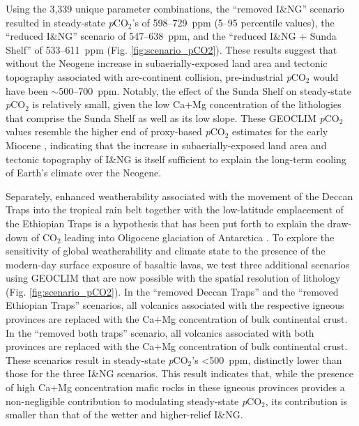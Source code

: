\documentclass[11pt,letterpaper]{article}
\newcommand{\pCOtwo}{\textit{p}CO$_{2}$\xspace}
\newcommand{\COtwo}{CO$_{2}$\xspace}
\begin{document}
Using the 3,339 unique parameter combinations, the ``removed I\&NG'' scenario resulted in steady-state \pCOtwo's of 598--729~ppm (5--95 percentile values), the ``reduced I\&NG'' scenario of 547--638~ppm, and the ``reduced I\&NG + Sunda Shelf'' of 533--611~ppm (Fig. \ref{fig:scenario_pCO2}). These results suggest that without the Neogene increase in subaerially-exposed land area and tectonic topography associated with arc-continent collision, pre-industrial \pCOtwo would have been $\sim$500--700~ppm. Notably, the effect of the Sunda Shelf on steady-state \pCOtwo is relatively small, given the low Ca+Mg concentration of the lithologies that comprise the Sunda Shelf as well as its low slope. These GEOCLIM \pCOtwo values resemble the higher end of proxy-based \pCOtwo estimates for the early Miocene \citep{Foster2017a}, indicating that the increase in subaerially-exposed land area and tectonic topography of I\&NG is itself sufficient to explain the long-term cooling of Earth's climate over the Neogene.

Separately, enhanced weatherability associated with the movement of the Deccan Traps into the tropical rain belt together with the low-latitude emplacement of the Ethiopian Traps is a hypothesis that has been put forth to explain the draw-down of \COtwo leading into Oligocene glaciation of Antarctica \citep{Kent2008a, Kent2013a}. To explore the sensitivity of global weatherability and climate state to the presence of the modern-day surface exposure of basaltic lavas, we test three additional scenarios using GEOCLIM that are now possible with the spatial resolution of lithology (Fig. \ref{fig:scenario_pCO2}). In the ``removed Deccan Traps'' and the ``removed Ethiopian Traps'' scenarios, all volcanics associated with the respective igneous provinces are replaced with the Ca+Mg concentration of bulk continental crust. In the ``removed both traps'' scenario, all volcanics associated with both provinces are replaced with the Ca+Mg concentration of bulk continental crust. These scenarios result in steady-state \pCOtwo's \textless500~ppm, distinctly lower than those for the three I\&NG scenarios. This result indicates that, while the presence of high Ca+Mg concentration mafic rocks in these igneous provinces provides a non-negligible contribution to modulating steady-state \pCOtwo, its contribution is smaller than that of the wetter and higher-relief I\&NG.
\end{document}
